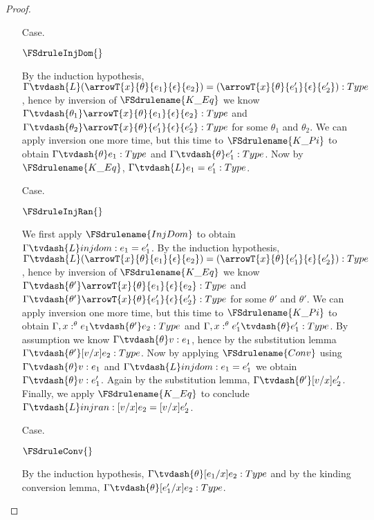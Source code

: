 \begin{proof}
\begin{itemize}
  \item[Case.] \ \\
    \begin{center}
      $\FSdruleInjDom{}$
    \end{center}
    By the induction hypothesis, 
    $\Gamma \tvdash{L} (\arrowT{x}{\theta}{e_1}{\epsilon}{e_2}) = 
    (\arrowT{x}{\theta}{e'_1}{\epsilon}{e'_2}):Type$, hence by inversion of 
    $\FSdrulename{K\_Eq}$ we know
    $\Gamma \tvdash{\theta_1} \arrowT{x}{\theta}{e_1}{\epsilon}{e_2}:Type$ and
    $\Gamma \tvdash{\theta_2} \arrowT{x}{\theta}{e'_1}{\epsilon}{e'_2}:Type$ for some $\theta_1$
    and $\theta_2$.  We can apply inversion one more time, but this time to 
    $\FSdrulename{K\_Pi}$ to obtain $\Gamma \tvdash{\theta} e_1:Type$ and 
    $\Gamma \tvdash{\theta} e'_1:Type$.  Now by 
    $\FSdrulename{K\_Eq}$, $\Gamma \tvdash{L} e_1 = e'_1:Type$.

  \item[Case.] \ \\
    \begin{center}
      $\FSdruleInjRan{}$
    \end{center}
    We first apply $\FSdrulename{InjDom}$ to obtain $\Gamma \tvdash{L} injdom:e_1 = e'_1$.
    By the induction hypothesis, 
    $\Gamma \tvdash{L} (\arrowT{x}{\theta}{e_1}{\epsilon}{e_2}) = 
    (\arrowT{x}{\theta}{e'_1}{\epsilon}{e'_2}):Type$, hence by inversion of 
    $\FSdrulename{K\_Eq}$ we know
    $\Gamma \tvdash{\theta'} \arrowT{x}{\theta}{e_1}{\epsilon}{e_2}:Type$ and
    $\Gamma \tvdash{\theta'} \arrowT{x}{\theta}{e'_1}{\epsilon}{e'_2}:Type$ for some $\theta'$
    and $\theta'$.  We can apply inversion one more time, but this time to 
    $\FSdrulename{K\_Pi}$ to obtain $\Gamma,x:^\theta e_1 \tvdash{\theta'} e_2:Type$ and 
    $\Gamma,x:^\theta e'_1 \tvdash{\theta} e'_1:Type$.  By assumption we know
    $\Gamma \tvdash{\theta} v:e_1$, hence by the substitution lemma 
    $\Gamma \tvdash{\theta'}[v/x]e_2:Type$.  Now by applying $\FSdrulename{Conv}$ using
    $\Gamma \tvdash{\theta} v:e_1$ and $\Gamma \tvdash{L} injdom:e_1 = e'_1$ we obtain
    $\Gamma \tvdash{\theta} v:e'_1$.  Again by the substitution lemma, 
    $\Gamma \tvdash{\theta'} [v/x]e'_2$.  Finally, we apply $\FSdrulename{K\_Eq}$ to conclude
    $\Gamma \tvdash{L} injran:[v/x]e_2 = [v/x]e'_2$.

  \item[Case.] \ \\
    \begin{center}
      $\FSdruleConv{}$
    \end{center}
    By the induction hypothesis, $\Gamma \tvdash{\theta} [e_1/x]e_2:Type$ and by the kinding 
    conversion lemma, $\Gamma \tvdash{\theta} [e'_1/x]e_2:Type$.


\end{itemize}
\end{proof}
